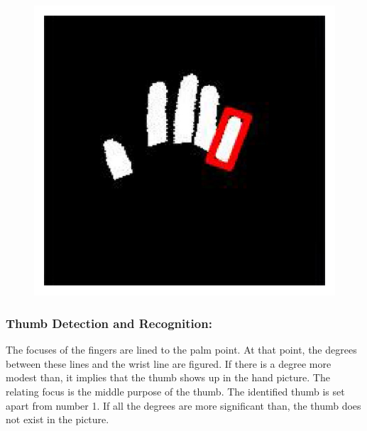 \documentclass[a4paper]{article}
\begin{document}
\begin{figure}[h!]
\begin{center}
\includegraphics[scale=1.5]{Fig9}
\label{fig:The minimal bounding box.}
\end{center}
\end{figure}

\subsubsection{Thumb Detection and Recognition:}
The focuses of the fingers are lined to the palm point. At that point, the degrees between these lines and the wrist line are figured. If there is a degree more modest than, it implies that the thumb shows up in the hand picture. The relating focus is the middle purpose of the thumb. The identified thumb is set apart from number 1. If all the degrees are more significant than, the thumb does not exist in the picture.
\end{document}
